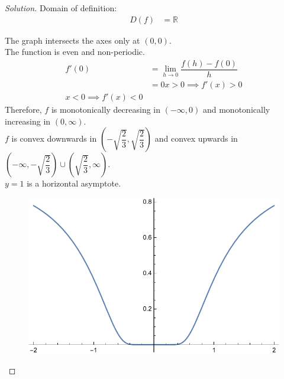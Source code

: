 \documentclass[fleqn, 12pt]{article}
\theoremstyle{definition}
\theoremstyle{theorem}
\newenvironment{solution}
{\begin{proof}[Solution]\let\qed\relax}
	{\end{proof}}
\begin{document}
\begin{solution}
	Domain of definition:
	\begin{align*}
		D(f) &= \mathbb{R}
	\end{align*}
	
	The graph intersects the axes only at $(0,0)$.\\
	
	The function is even and non-periodic.\\
	
	\begin{align*}
		f'(0) &= \lim\limits_{h \to 0} \dfrac{f(h) - f(0)}{h}\\
		&= 0
		x > 0 \implies f'(x) > 0\\
		x < 0 \implies f'(x) < 0
	\end{align*}
	Therefore, $f$ is monotonically decreasing in $(-\infty, 0)$ and monotonically increasing in $(0, \infty)$.\\
	
	$f$ is convex downwards in $\left( -\sqrt{\dfrac{2}{3}}, \sqrt{\dfrac{2}{3}} \right)$ and convex upwards in $\left( -\infty, -\sqrt{\dfrac{2}{3}} \right) \cup \left( \sqrt{\dfrac{2}{3}}, \infty \right)$.\\
	
	$y = 1$ is a horizontal asymptote.
	
	\begin{figure}[h]
		\includegraphics{Function2.pdf}
	\end{figure}
\end{solution}
\end{document}

